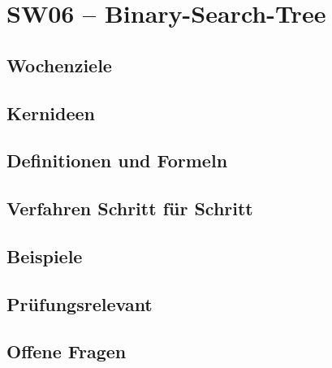 \chapter{SW06 – Binary-Search-Tree}
\label{kap:sw06}

\section*{Wochenziele}
\begin{wochenziele}
\end{wochenziele}

\section{Kernideen}

\section{Definitionen und Formeln}

\section{Verfahren Schritt für Schritt}

\section{Beispiele}

\section{Prüfungsrelevant}

\section{Offene Fragen}
